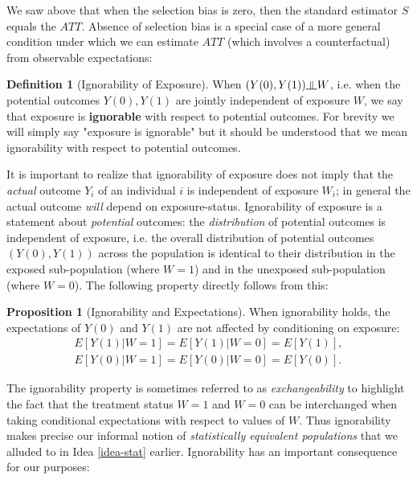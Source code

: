 \documentclass[11pt,a4paper]{article}
\newcommand{\indep}{\rotatebox[origin=c]{90}{$\models$}}
\theoremstyle{definition}
\newtheorem{definition}{Definition}[section]
\theoremstyle{remark}
\theoremstyle{definition}
\theoremstyle{definition}
\theoremstyle{definition}
\theoremstyle{definition}
\theoremstyle{definition}
\theoremstyle{definition}
\newtheorem{proposition}[theorem]{Proposition}
\begin{document}
We saw above that when the selection bias is zero, then the standard estimator $S$ equals the $ATT$. Absence of selection bias is a special case of a more general condition under which we can estimate $ATT$ (which involves a counterfactual) from observable expectations:

\begin{definition}[Ignorability of Exposure] \label{def-ignor}
	When $(Y(0), Y(1) ) \indep W$, i.e. when the potential outcomes $Y(0), Y(1)$ are jointly independent of exposure $W$, we say that exposure is {\bf ignorable} with respect to potential outcomes. For brevity we will simply say "exposure is ignorable" but it should be understood that we mean ignorability with respect to potential outcomes.
\end{definition}

It is important to realize that ignorability of exposure does not imply that the \textit{actual} outcome $Y_i$ of an individual $i$ is independent of exposure $W_i$; 
in general the actual outcome \textit{will} depend on exposure-status. Ignorability of exposure is a statement about \textit{potential} outcomes: 
the \textit{distribution} of potential outcomes is independent of exposure, i.e. the overall distribution of potential outcomes $(Y(0), Y(1))$ across the population is identical to their distribution in the exposed sub-population (where $W=1$) and in the unexposed sub-population (where $W=0$). The following property directly follows from this:

\begin{proposition}[Ignorability and Expectations]\label{prop-ignor}
When ignorability holds, the expectations of $Y(0)$ and $Y(1)$ are not affected by conditioning on exposure:
\begin{eqnarray} 
  E[Y(1) | W=1] = E[ Y(1) | W = 0] = E[Y(1)],\\
  E[Y(0) | W=1] = E[ Y(0) | W = 0] = E[Y(0)].  \label{eq-ignor}
\end{eqnarray}

	
\end{proposition}



The ignorability property is sometimes referred to as {\em exchangeability} to highlight the fact that the treatment status $W=1$ and $W=0$ can be interchanged when taking conditional expectations with respect to values of $W$. 
Thus ignorability makes precise our informal notion of {\em statistically equivalent populations} that we alluded to in Idea \ref{idea-stat} earlier. Ignorability has an important consequence for our purposes:
\end{document}
